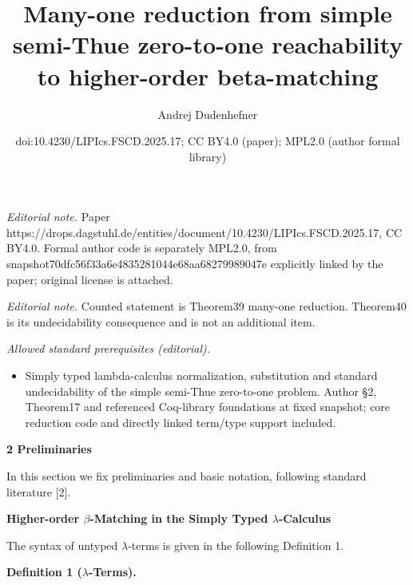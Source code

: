 \documentclass[10pt,a4paper]{amsart}
\title{Many-one reduction from simple semi-Thue zero-to-one reachability to higher-order beta-matching}
\author{Andrej Dudenhefner}
\date{doi:10.4230/LIPIcs.FSCD.2025.17; CC BY4.0 (paper); MPL2.0 (author formal library)}
\begin{document}
\maketitle
\noindent\textit{Editorial note.} Paper https://drops.dagstuhl.de/entities/document/10.4230/LIPIcs.FSCD.2025.17, CC BY4.0. Formal author code is separately MPL2.0, from snapshot70dfc56f33a6e4835281044e68aa68279989047e explicitly linked by the paper; original license is attached.\par\medskip
\noindent\textit{Editorial note.} Counted statement is Theorem39 many-one reduction. Theorem40 is its undecidability consequence and is not an additional item.\par\medskip
\noindent\textit{Allowed standard prerequisites (editorial).}\begin{itemize}
\item Simply typed lambda-calculus normalization, substitution and standard undecidability of the simple semi-Thue zero-to-one problem. Author §2, Theorem17 and referenced Coq-library foundations at fixed snapshot; core reduction code and directly linked term/type support included.
\end{itemize}\medskip
 
\par\medskip\noindent\textbf{2 Preliminaries}\par
 
 
In this section we fix preliminaries and basic notation, following standard literature [2].\par
 
 
 
\par\medskip\noindent\textbf{Higher-order $\beta$-Matching in the Simply Typed $\lambda$-Calculus}\par
 
 
The syntax of untyped $\lambda$-terms is given in the following Definition 1.\par
 
 
 
\par\medskip\noindent\textbf{Definition 1 ($\lambda$-Terms).}\par
 
 
\end{document}
